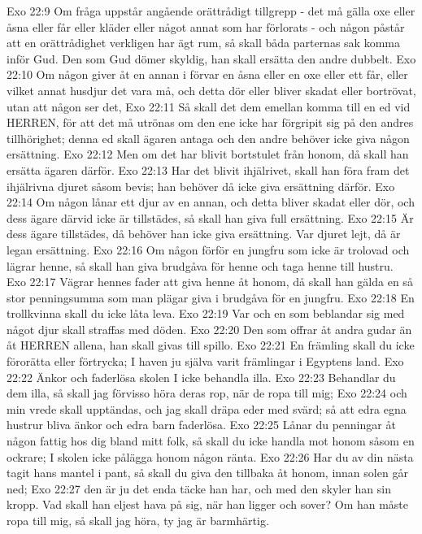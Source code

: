Exo 22:9  Om fråga uppstår angående orättrådigt tillgrepp - det må gälla oxe eller åsna eller får eller kläder eller något annat som har förlorats - och någon påstår att en orättrådighet verkligen har ägt rum, så skall båda parternas sak komma inför Gud. Den som Gud dömer skyldig, han skall ersätta den andre dubbelt.
Exo 22:10  Om någon giver åt en annan i förvar en åsna eller en oxe eller ett får, eller vilket annat husdjur det vara må, och detta dör eller bliver skadat eller bortrövat, utan att någon ser det,
Exo 22:11  Så skall det dem emellan komma till en ed vid HERREN, för att det må utrönas om den ene icke har förgripit sig på den andres tillhörighet; denna ed skall ägaren antaga och den andre behöver icke giva någon ersättning.
Exo 22:12  Men om det har blivit bortstulet från honom, då skall han ersätta ägaren därför.
Exo 22:13  Har det blivit ihjälrivet, skall han föra fram det ihjälrivna djuret såsom bevis; han behöver då icke giva ersättning därför.
Exo 22:14  Om någon lånar ett djur av en annan, och detta bliver skadat eller dör, och dess ägare därvid icke är tillstädes, så skall han giva full ersättning.
Exo 22:15  Är dess ägare tillstädes, då behöver han icke giva ersättning. Var djuret lejt, då är legan ersättning.
Exo 22:16  Om någon förför en jungfru som icke är trolovad och lägrar henne, så skall han giva brudgåva för henne och taga henne till hustru.
Exo 22:17  Vägrar hennes fader att giva henne åt honom, då skall han gälda en så stor penningsumma som man plägar giva i brudgåva för en jungfru.
Exo 22:18  En trollkvinna skall du icke låta leva.
Exo 22:19  Var och en som beblandar sig med något djur skall straffas med döden.
Exo 22:20  Den som offrar åt andra gudar än åt HERREN allena, han skall givas till spillo.
Exo 22:21  En främling skall du icke förorätta eller förtrycka; I haven ju själva varit främlingar i Egyptens land.
Exo 22:22  Änkor och faderlösa skolen I icke behandla illa.
Exo 22:23  Behandlar du dem illa, så skall jag förvisso höra deras rop, när de ropa till mig;
Exo 22:24  och min vrede skall upptändas, och jag skall dräpa eder med svärd; så att edra egna hustrur bliva änkor och edra barn faderlösa.
Exo 22:25  Lånar du penningar åt någon fattig hos dig bland mitt folk, så skall du icke handla mot honom såsom en ockrare; I skolen icke pålägga honom någon ränta.
Exo 22:26  Har du av din nästa tagit hans mantel i pant, så skall du giva den tillbaka åt honom, innan solen går ned;
Exo 22:27  den är ju det enda täcke han har, och med den skyler han sin kropp. Vad skall han eljest hava på sig, när han ligger och sover? Om han måste ropa till mig, så skall jag höra, ty jag är barmhärtig.
